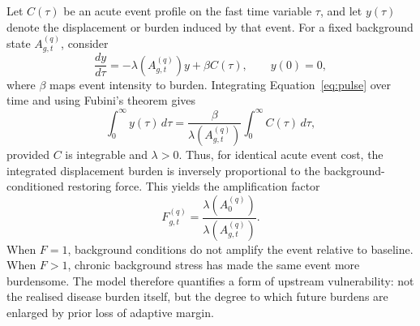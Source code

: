	Let $C(\tau)$ be an acute event profile on the fast time variable $\tau$, and let $y(\tau)$ denote the displacement or burden induced by that event. For a fixed background state $A_{g,t}^{(q)}$, consider
	\begin{equation}
		\frac{dy}{d\tau} = -\lambda(A^{(q)}_{g,t})y + \beta C(\tau),
		\qquad y(0)=0,
		\label{eq:pulse}
	\end{equation}
	where $\beta$ maps event intensity to burden. Integrating Equation~\eqref{eq:pulse} over time and using Fubini's theorem gives
	\begin{equation}
		\int_0^\infty y(\tau)\,d\tau
		= \frac{\beta}{\lambda(A^{(q)}_{g,t})}
		\int_0^\infty C(\tau)\,d\tau,
		\label{eq:auc}
	\end{equation}
	provided $C$ is integrable and $\lambda>0$. Thus, for identical acute event cost, the integrated displacement burden is inversely proportional to the background-conditioned restoring force. This yields the amplification factor
	\begin{equation}
		F^{(q)}_{g,t}=\frac{\lambda(A^{(q)}_0)}{\lambda(A^{(q)}_{g,t})}.
		\label{eq:F}
	\end{equation}
	When $F=1$, background conditions do not amplify the event relative to baseline. When $F>1$, chronic background stress has made the same event more burdensome. The model therefore quantifies a form of upstream vulnerability: not the realised disease burden itself, but the degree to which future burdens are enlarged by prior loss of adaptive margin.
	
